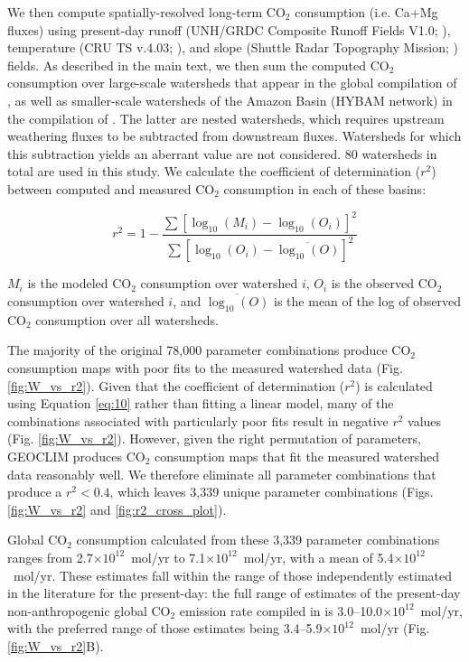\documentclass[11pt,letterpaper]{article}
\newcommand{\COtwo}{CO$_{2}$\xspace}
\begin{document}
We then compute spatially-resolved long-term \COtwo consumption (i.e. Ca+Mg fluxes) using present-day runoff (UNH/GRDC Composite Runoff Fields V1.0; \citealp{Fekete1999a}), temperature (CRU TS v.4.03; \citealp{Harris2013a}), and slope (Shuttle Radar Topography Mission; \citealp{Farr2007a}) fields. As described in the main text, we then sum the computed \COtwo consumption over large-scale watersheds that appear in the global compilation of \citet{Gaillardet1999a}, as well as smaller-scale watersheds of the Amazon Basin (HYBAM network) in the compilation of \citet{Moquet2011a, Moquet2016a, Moquet2018a}. The latter are nested watersheds, which requires upstream weathering fluxes to be subtracted from downstream fluxes. Watersheds for which this subtraction yields an aberrant value are not considered. 80 watersheds in total are used in this study. We calculate the coefficient of determination ($r^{2}$) between computed and measured \COtwo consumption in each of these basins:

\begin{equation}
    r^{2} = 1 - \frac{\sum\left[ \log_{10}(M_{i}) - \log_{10}(O_{i}) \right]^{2}}{\sum\left[ \log_{10}(O_{i}) - \overline{\log_{10}(O)} \right]^{2}}
    \label{eq:10}
\end{equation}

\noindent
$M_{i}$ is the modeled \COtwo consumption over watershed $i$, $O_{i}$ is the observed \COtwo consumption over watershed $i$, and $\overline{\log_{10}(O)}$ is the mean of the log of observed \COtwo consumption over all watersheds.

The majority of the original 78,000 parameter combinations produce \COtwo consumption maps with poor fits to the measured watershed data (Fig. \ref{fig:W_vs_r2}). Given that the coefficient of determination ($r^{2}$) is calculated using Equation \ref{eq:10} rather than fitting a linear model, many of the combinations associated with particularly poor fits result in negative $r^{2}$ values (Fig. \ref{fig:W_vs_r2}). However, given the right permutation of parameters, GEOCLIM produces \COtwo consumption maps that fit the measured watershed data reasonably well. We therefore eliminate all parameter combinations that produce a $r^{2}<0.4$, which leaves 3,339 unique parameter combinations (Figs. \ref{fig:W_vs_r2} and \ref{fig:r2_cross_plot}).

Global CO$_{2}$ consumption calculated from these 3,339 parameter combinations ranges from 2.7$\times10^{12}$~mol/yr to 7.1$\times10^{12}$~mol/yr, with a mean of 5.4$\times10^{12}$~mol/yr. These estimates fall within the range of those independently estimated in the literature for the present-day: the full range of estimates of the present-day non-anthropogenic global CO$_{2}$ emission rate compiled in \citet{Gerlach2011a} is 3.0--10.0$\times10^{12}$~mol/yr, with the preferred range of those estimates being 3.4--5.9$\times10^{12}$~mol/yr (Fig. \ref{fig:W_vs_r2}B).
\end{document}
